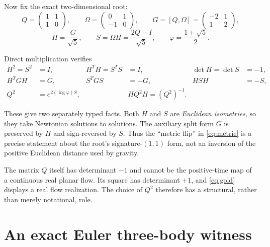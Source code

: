 \documentclass[11pt,letterpaper]{article}
\theoremstyle{paper}
\begin{document}
Now fix the exact two-dimensional root:
\begin{equation}
Q=\begin{pmatrix}1&1\\1&0\end{pmatrix},\qquad
\Omega=\begin{pmatrix}0&1\\-1&0\end{pmatrix},\qquad
G=[Q,\Omega]=\begin{pmatrix}-2&1\\1&2\end{pmatrix},
\label{eq:root}
\end{equation}
\begin{equation}
H=\frac{G}{\sqrt5},\qquad
S=\Omega H=\frac{2Q-I}{\sqrt5},\qquad
\varphi=\frac{1+\sqrt5}{2}.
\label{eq:operators}
\end{equation}

Direct multiplication verifies
\begin{align}
H^2=S^2&=I, & H^TH=S^TS&=I, & \det H=\det S&=-1, \label{eq:orth}\\
H^TGH&=G, & S^TGS&=-G, & HSH&=-S, \label{eq:metric}\\
Q^2&=e^{2(\log\varphi)S}, && HQ^2H=(Q^2)^{-1}.\label{eq:gold}
\end{align}

These give two separately typed facts. Both $H$ and $S$ are \emph{Euclidean isometries}, so they take Newtonian solutions to solutions. The auxiliary split form $G$ is preserved by $H$ and sign-reversed by $S$. Thus the ``metric flip'' in \eqref{eq:metric} is a precise statement about the root's signature-$(1,1)$ form, not an inversion of the positive Euclidean distance used by gravity.

The matrix $Q$ itself has determinant $-1$ and cannot be the positive-time map of a continuous real planar flow. Its square has determinant $+1$, and \eqref{eq:gold} displays a real flow realization. The choice of $Q^2$ therefore has a structural, rather than merely notational, role.

\section{An exact Euler three-body witness}
\end{document}
